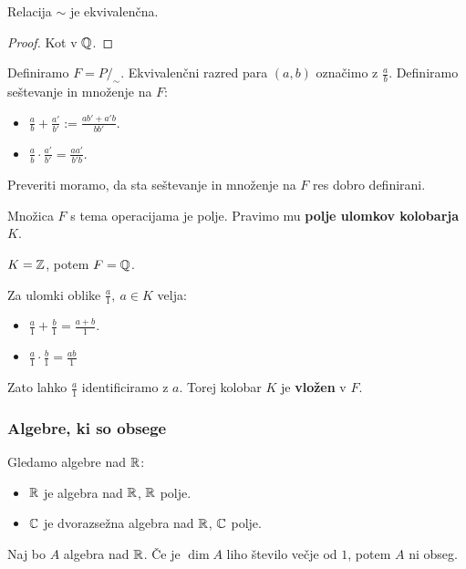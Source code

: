 \begin{trditev}
    Relacija $\sim$ je ekvivalenčna.
\end{trditev}

\begin{proof}
    Kot v $\mathbb{Q}$.
\end{proof}

Definiramo $F = P/_\sim$. Ekvivalenčni razred para $(a,b)$ označimo z $\frac{a}{b}$. Definiramo seštevanje in množenje na $F$:
\begin{itemize}
    \item $\frac{a}{b} + \frac{a'}{b'} := \frac{ab' + a'b}{bb'}$.
    \item $\frac{a}{b} \cdot \frac{a'}{b'} = \frac{aa'}{b'b}$.
\end{itemize}
Preveriti moramo, da sta seštevanje in množenje na $F$ res dobro definirani.
\begin{trditev}
    Množica $F$ s tema operacijama je polje. Pravimo mu \textbf{polje ulomkov kolobarja $K$}.
\end{trditev}

\begin{primer}
    $K = \mathbb{Z}$, potem $F = \mathbb{Q}$.
\end{primer}

\begin{opomba}
    Za ulomki oblike $\frac{a}{1}, \ a \in K$ velja:
    \begin{itemize}
        \item $\frac{a}{1} + \frac{b}{1} = \frac{a+b}{1}$.
        \item $\frac{a}{1} \cdot \frac{b}{1} = \frac{ab}{1}$
    \end{itemize}
    Zato lahko $\frac{a}{1}$ identificiramo z $a$. Torej kolobar $K$ je \textbf{vložen} v $F$.
\end{opomba}

\subsubsection*{Algebre, ki so obsege}
Gledamo algebre nad $\mathbb{R}$:
\begin{itemize}
    \item $\mathbb{R}$ je algebra nad $\mathbb{R}$, $\mathbb{R}$ polje.
    \item $\mathbb{C}$ je dvorazsežna algebra nad $\mathbb{R}$, $\mathbb{C}$ polje.
\end{itemize}

\begin{trditev}
    Naj bo $A$ algebra nad $\mathbb{R}$. Če je $\dim A$ liho število večje od $1$, potem $A$ ni obseg.
\end{trditev}

